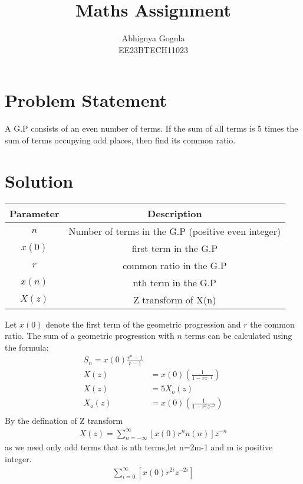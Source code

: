 \documentclass{article}
\begin{document}
\title{Maths Assignment}
\author{Abhignya Gogula\\
        EE23BTECH11023}
\maketitle
\section*{Problem Statement}
A G.P consists of an even number of terms. If the sum of all terms is 5 times the sum of terms occupying odd places, then find its common ratio.
\section*{Solution}
\begin{table}[h!]
\centering
\begin{tabular}{|c|c|}
\hline
Parameter & Description \\
\hline
\( n \) & Number of terms in the G.P (positive even integer) \\
\hline
\(x(0) \) & first term in the G.P \\
\hline
\( r \) & common ratio in the G.P \\
\hline
\( x(n) \) & nth term in the G.P \\
\hline
\( X(z) \) & Z transform of X(n) \\
\hline
\end{tabular}
\end{table}
Let \( x(0) \) denote the first term of the geometric progression and \( r \) the common ratio. The sum of a geometric progression with \( n \) terms can be calculated using the formula:
\begin{align}
 S_n = x(0) \frac{{r^n - 1}}{{r - 1}} \\
X(z) &= x(0)\left(\frac{1}{1 - rz^{-1}}\right) \\
X(z) &= 5 X_o(z) \\
X_o(z) &= x(0)\left(\frac{1}{1 - r^2z^{-2}}\right) \\
\end{align}
By the defination of Z transform 
\begin{align}
X(z)= \sum_{n=-\infty}^{\infty} [x(0)r^{n}u(n)]z^{-n}
\end{align}
as we need only odd terms that is nth terms,let n=2m-1 and m is positive integer.
\begin{align}
\sum_{i=0}^{\infty} [x(0)r^{2i}z^{-2i}]
\end{align}
\end{document}
